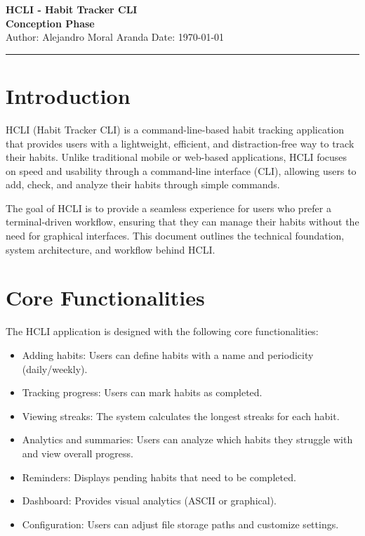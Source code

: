 \documentclass[a4paper,12pt]{article}
\begin{document}
\begin{center}
    {\LARGE \textbf{HCLI - Habit Tracker CLI}}\\[0.5cm]
    {\Large \textbf{Conception Phase}}\\[0.3cm]
    {\small Author: Alejandro Moral Aranda \hspace{1cm} Date: \today}
    \hrule
\end{center}

\section{Introduction}
HCLI (Habit Tracker CLI) is a command-line-based habit tracking application that provides users with a lightweight, efficient, and distraction-free way to track their habits. Unlike traditional mobile or web-based applications, HCLI focuses on speed and usability through a command-line interface (CLI), allowing users to add, check, and analyze their habits through simple commands.

The goal of HCLI is to provide a seamless experience for users who prefer a terminal-driven workflow, ensuring that they can manage their habits without the need for graphical interfaces. This document outlines the technical foundation, system architecture, and workflow behind HCLI.

\section{Core Functionalities}
The HCLI application is designed with the following core functionalities:
\begin{itemize}
    \item Adding habits: Users can define habits with a name and periodicity (daily/weekly).
    \item Tracking progress: Users can mark habits as completed.
    \item Viewing streaks: The system calculates the longest streaks for each habit.
    \item Analytics and summaries: Users can analyze which habits they struggle with and view overall progress.
    \item Reminders: Displays pending habits that need to be completed.
    \item Dashboard: Provides visual analytics (ASCII or graphical).
    \item Configuration: Users can adjust file storage paths and customize settings.
\end{itemize}
\end{document}
